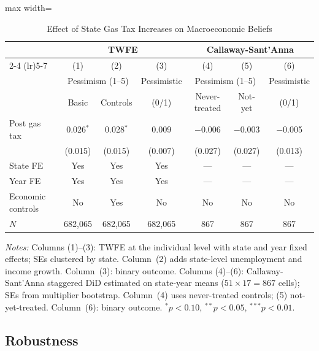 \documentclass[12pt]{article}
\begin{document}
\begin{table}[H]
\centering
\caption{Effect of State Gas Tax Increases on Macroeconomic Beliefs}
\label{tab:main_results}
\begin{threeparttable}
\begin{adjustbox}{max width=\textwidth}
\begin{tabular}{lcccccc}
\toprule
& \multicolumn{3}{c}{TWFE} & \multicolumn{3}{c}{Callaway-Sant'Anna} \\
\cmidrule(lr){2-4} \cmidrule(lr){5-7}
& (1) & (2) & (3) & (4) & (5) & (6) \\
\midrule
& \multicolumn{2}{c}{Pessimism (1--5)} & Pessimistic & \multicolumn{2}{c}{Pessimism (1--5)} & Pessimistic \\
& Basic & Controls & (0/1) & Never-treated & Not-yet & (0/1) \\
\midrule
Post gas tax & 0.026$^{*}$ & 0.028$^{*}$ & 0.009 & $-$0.006 & $-$0.003 & $-$0.005 \\
& (0.015) & (0.015) & (0.007) & (0.027) & (0.027) & (0.013) \\
\midrule
State FE & Yes & Yes & Yes & --- & --- & --- \\
Year FE & Yes & Yes & Yes & --- & --- & --- \\
Economic controls & No & Yes & No & No & No & No \\
$N$ & 682,065 & 682,065 & 682,065 & 867 & 867 & 867 \\
\bottomrule
\end{tabular}
\end{adjustbox}
\end{threeparttable}
\par\vspace{0.5em}
\parbox{\textwidth}{\small\textit{Notes:} Columns (1)--(3): TWFE at the individual level with state and year fixed effects; SEs clustered by state. Column~(2) adds state-level unemployment and income growth. Column~(3): binary outcome. Columns (4)--(6): Callaway-Sant'Anna staggered DiD estimated on state-year means ($51 \times 17 = 867$ cells); SEs from multiplier bootstrap. Column~(4) uses never-treated controls; (5) not-yet-treated. Column~(6): binary outcome. $^{*}\!p<0.10$, $^{**}\!p<0.05$, $^{***}\!p<0.01$.}
\end{table}

\subsection{Robustness}
\end{document}
